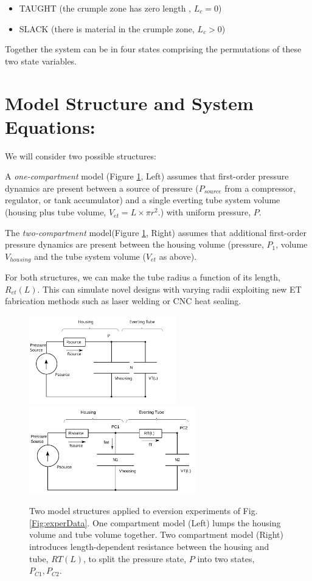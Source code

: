 \documentclass[letterpaper]{article}
\begin{document}
\begin{itemize}
  \item TAUGHT (the crumple zone has zero length , $L_c = 0 $)
  \item SLACK (there is material in the crumple zone, $L_c > 0$)
\end{itemize}

Together the system can be in four states comprising the permutations
of these two state variables.

\section{Model Structure and System Equations:}

We will consider two possible structures:

A {\it one-compartment} model (Figure \ref{Fig:TwoStructures}, Left)
assumes that first-order pressure dynamics are present between a source of   pressure  ($P_{source}$ from a compressor, regulator, or tank accumulator)
and a single  everting tube system volume (housing plus tube volume, $V_{et} = L\times \pi r^2$.) with uniform pressure, $P$.

The {\it two-compartment} model(Figure \ref{Fig:TwoStructures}, Right)
assumes that additional first-order pressure dynamics are present between
the housing volume (pressure, $P_1$, volume $V_{housing}$ and the tube system volume ($V_{et}$ as above).

For both structures, we can make the tube radius a function of its length, $R_{et}(L)$.   This can simulate novel designs with varying
radii exploiting new ET
fabrication methods such as laser welding or CNC heat sealing.

\begin{figure}[h]\centering
\includegraphics[height=1.5in]{Figure_OneCompartment.png}
\includegraphics[height=1.5in]{Figure_TwoCompartment.png}
\caption{Two model structures applied to eversion experiments of
Fig. \ref{Fig:experData}.  One compartment model (Left) lumps the
housing volume and tube volume together. Two compartment model (Right)
introduces length-dependent resistance between the housing and tube, $RT(L)$, to split the pressure state, $P$ into two states, $P_{C1}, P_{C2}$.}\label{Fig:TwoStructures}
\end{figure}
\end{document}
